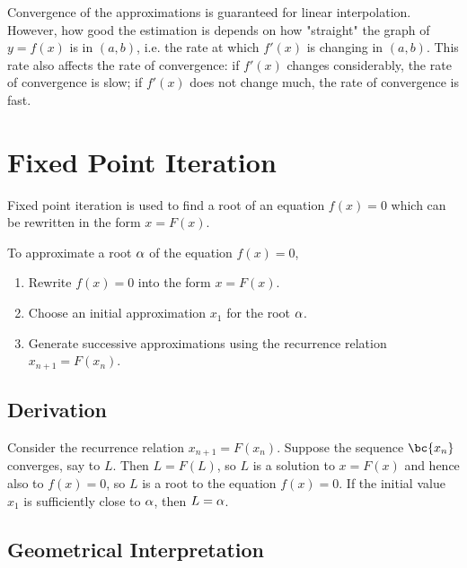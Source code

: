 Convergence of the approximations is guaranteed for linear interpolation. However, how good the estimation is depends on how "straight" the graph of $y = f(x)$ is in $(a, b)$, i.e. the rate at which $f'(x)$ is changing in $(a, b)$. This rate also affects the rate of convergence: if $f'(x)$ changes considerably, the rate of convergence is slow; if $f'(x)$ does not change much, the rate of convergence is fast.

\section{Fixed Point Iteration}

Fixed point iteration is used to find a root of an equation $f(x) = 0$ which can be rewritten in the form $x = F(x)$.

\begin{recipe}
    To approximate a root $\alpha$ of the equation $f(x) = 0$,
    \begin{enumerate}
        \item Rewrite $f(x) = 0$ into the form $x = F(x)$.
        \item Choose an initial approximation $x_1$ for the root $\alpha$.
        \item Generate successive approximations using the recurrence relation $x_{n+1} = F(x_n)$.
    \end{enumerate}
\end{recipe}

\subsection{Derivation}

Consider the recurrence relation $x_{n+1} = F(x_n)$. Suppose the sequence $\bc{x_n}$ converges, say to $L$. Then $L = F(L)$, so $L$ is a solution to $x = F(x)$ and hence also to $f(x) = 0$, so $L$ is a root to the equation $f(x) = 0$. If the initial value $x_1$ is sufficiently close to $\alpha$, then $L = \alpha$.

\subsection{Geometrical Interpretation}

